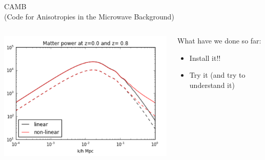 \documentclass[a4paper,10pt]{beamer}
\begin{document}
\begin{frame}

 \begin{center}
 \huge{\color{blue}CAMB} \\ \large{(Code for Anisotropies in the Microwave Background)} \\
 \vspace{1cm}
 \end{center}
 
 \begin{center}
 \begin{columns}[c]
  \column{2in}
  \includegraphics[scale=0.35]{CAMB}
  \column{2in}
  \begin{block}{What have we done so far:}
    \begin{itemize}
     \item Install it!!
     \item Try it (and try to understand it)
    \end{itemize}
  \end{block}

 \end{columns}
 \end{center}
 
 
\end{frame}
\end{document}
